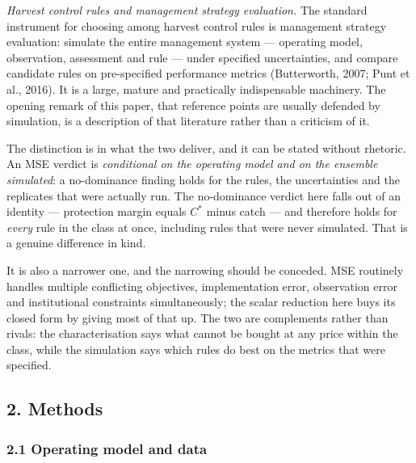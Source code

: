 \textit{Harvest control rules and management strategy evaluation.} The standard instrument for
choosing among harvest control rules is management strategy evaluation: simulate the entire
management system --- operating model, observation, assessment and rule --- under specified
uncertainties, and compare candidate rules on pre-specified performance metrics (Butterworth,
2007; Punt et al., 2016). It is a large, mature and practically indispensable machinery. The
opening remark of this paper, that reference points are usually defended by simulation, is a
description of that literature rather than a criticism of it.

The distinction is in what the two deliver, and it can be stated without rhetoric. An MSE
verdict is \emph{conditional on the operating model and on the ensemble simulated}: a
no-dominance finding holds for the rules, the uncertainties and the replicates that were
actually run. The no-dominance verdict here falls out of an identity --- protection margin
equals $C^{*}$ minus catch --- and therefore holds for \emph{every} rule in the class at
once, including rules that were never simulated. That is a genuine difference in kind.

It is also a narrower one, and the narrowing should be conceded. MSE routinely handles
multiple conflicting objectives, implementation error, observation error and institutional
constraints simultaneously; the scalar reduction here buys its closed form by giving most of
that up. The two are complements rather than rivals: the characterisation says what cannot be
bought at any price within the class, while the simulation says which rules do best on the
metrics that were specified.

\subsection{2. Methods}\label{budget-methods}

\subsubsection{2.1 Operating model and
data}\label{budget-operating-model-and-data}

